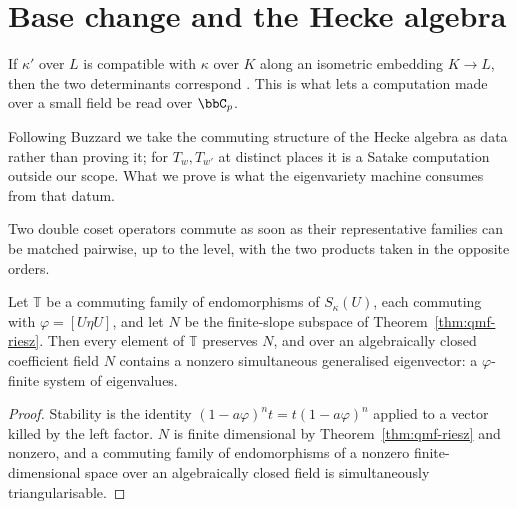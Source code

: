\section{Base change and the Hecke algebra}

\begin{proposition}
  \label{prop:qmf-basechange}
  \leanok
  If $\kappa'$ over $L$ is compatible with $\kappa$ over $K$ along an isometric embedding $K \to
  L$, then the two determinants correspond \cite[Lemma 2.13]{Buzzard}.  This is what lets a
  computation made over a small field be read over $\bbC_p$.
\end{proposition}

Following Buzzard \cite[\S5]{Buzzard} we take the commuting structure of the Hecke algebra as
data rather than proving it; for $T_w, T_{w'}$ at distinct places it is a Satake computation
outside our scope.  What we prove is what the eigenvariety machine consumes from that datum.

\begin{proposition}
  \label{prop:hecke-comm-criterion}
  \leanok
  Two double coset operators commute as soon as their representative families can be matched
  pairwise, up to the level, with the two products taken in the opposite orders.
\end{proposition}


\begin{proposition}
  \label{prop:qmf-eigensystem}
  \leanok
  Let $\mathbb{T}$ be a commuting family of endomorphisms of $S_\kappa(U)$, each commuting with $\varphi
  = [U\eta U]$, and let $N$ be the finite-slope subspace of Theorem~\ref{thm:qmf-riesz}.  Then
  every element of $\mathbb{T}$ preserves $N$, and over an algebraically closed coefficient field $N$
  contains a nonzero simultaneous generalised eigenvector: a $\varphi$-finite system of
  eigenvalues.
\end{proposition}

\begin{proof}
  \leanok
  Stability is the identity $(1-a\varphi)^n t = t (1-a\varphi)^n$ applied to a vector killed by
  the left factor.  $N$ is finite dimensional by Theorem~\ref{thm:qmf-riesz} and nonzero, and a
  commuting family of endomorphisms of a nonzero finite-dimensional space over an algebraically
  closed field is simultaneously triangularisable.
\end{proof}


